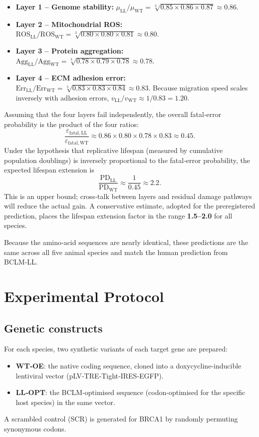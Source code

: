 \documentclass[12pt,a4paper]{article}
\begin{document}
	\begin{itemize}
		\item \textbf{Layer 1 – Genome stability:} \(\mu_{\mathrm{LL}}/\mu_{\mathrm{WT}} = \sqrt[3]{0.85\times0.86\times0.87} \approx 0.86\).
		\item \textbf{Layer 2 – Mitochondrial ROS:} \(\mathrm{ROS}_{\mathrm{LL}}/\mathrm{ROS}_{\mathrm{WT}} = \sqrt[3]{0.80\times0.80\times0.81} \approx 0.80\).
		\item \textbf{Layer 3 – Protein aggregation:} \(\mathrm{Agg}_{\mathrm{LL}}/\mathrm{Agg}_{\mathrm{WT}} = \sqrt[3]{0.78\times0.79\times0.78} \approx 0.78\).
		\item \textbf{Layer 4 – ECM adhesion error:} \(\mathrm{Err}_{\mathrm{LL}}/\mathrm{Err}_{\mathrm{WT}} = \sqrt[3]{0.83\times0.83\times0.84} \approx 0.83\). Because migration speed scales inversely with adhesion errors, \(v_{\mathrm{LL}}/v_{\mathrm{WT}} \approx 1/0.83 = 1.20\).
	\end{itemize}
	
	Assuming that the four layers fail independently, the overall fatal‑error probability is the product of the four ratios:
	\[
	\frac{\varepsilon_{\mathrm{fatal,LL}}}{\varepsilon_{\mathrm{fatal,WT}}} \approx 0.86 \times 0.80 \times 0.78 \times 0.83 \approx 0.45.
	\]
	Under the hypothesis that replicative lifespan (measured by cumulative population doublings) is inversely proportional to the fatal‑error probability, the expected lifespan extension is
	\[
	\frac{\mathrm{PD}_{\mathrm{LL}}}{\mathrm{PD}_{\mathrm{WT}}} \approx \frac{1}{0.45} \approx 2.2.
	\]
	This is an upper bound; cross‑talk between layers and residual damage pathways will reduce the actual gain. A conservative estimate, adopted for the preregistered prediction, places the lifespan extension factor in the range \textbf{1.5–2.0} for all species.
	
	Because the amino‑acid sequences are nearly identical, these predictions are the same across all five animal species and match the human prediction from BCLM‑LL.
	
	\section{Experimental Protocol}
	\label{sec:protocol}
	
	\subsection{Genetic constructs}
	For each species, two synthetic variants of each target gene are prepared:
	\begin{itemize}
		\item \textbf{WT‑OE}: the native coding sequence, cloned into a doxycycline‑inducible lentiviral vector (pLV‑TRE‑Tight‑IRES‑EGFP).
		\item \textbf{LL‑OPT}: the BCLM‑optimised sequence (codon‑optimised for the specific host species) in the same vector.
	\end{itemize}
	A scrambled control (SCR) is generated for BRCA1 by randomly permuting synonymous codons.
	
\end{document}
